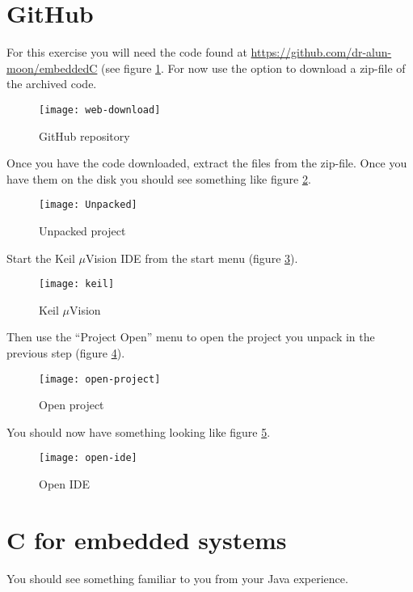 \documentclass[a4paper]{tufte-handout}
\begin{document}
\section{GitHub}

For this exercise you  will need the code found at
\url{https://github.com/dr-alun-moon/embeddedC} (see figure
\ref{fig:github}.  For now use the option to download a zip-file of
the archived code.  

\begin{figure}
  \flushright
  \texttt{[image: web-download]}
  \caption{GitHub repository}
  \label{fig:github}
\end{figure}

Once you have the code downloaded, extract the files from the
zip-file.  Once you have them on the disk you
should see something like figure \ref{fig:unpacked}.
\begin{figure}[h]
  \flushright
  \texttt{[image: Unpacked]}
  \caption{Unpacked project}
  \label{fig:unpacked}
\end{figure}

Start the Keil {$\mu$Vision} IDE from the start menu (figure \ref{fig:uvision}).
\begin{figure}[h]
  \flushright
  \texttt{[image: keil]}
  \caption{Keil $\mu$Vision}
  \label{fig:uvision}
\end{figure}
Then use the ``Project Open'' menu to open the project you unpack in
the previous step (figure \ref{fig:open-project}).
\begin{figure}[h]
  \flushright
  \texttt{[image: open-project]}
  \caption{Open project}
  \label{fig:open-project}
\end{figure}
You should now have something looking like figure \ref{fig:ide}.
\begin{figure}
  \texttt{[image: open-ide]}
  \caption{Open IDE}
  \label{fig:ide}
\end{figure}
\clearpage
\section{C for embedded systems}
You should see something familiar to you from your Java experience.
\end{document}
